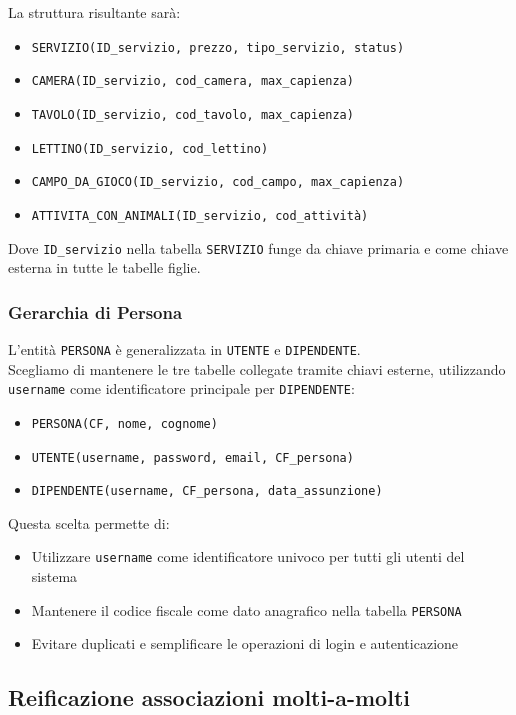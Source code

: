 \documentclass[a4paper,12pt]{report}
\begin{document}
La struttura risultante sarà:
\begin{itemize}
    \item \texttt{SERVIZIO(ID\_servizio, prezzo, tipo\_servizio, status)}
    \item \texttt{CAMERA(ID\_servizio, cod\_camera, max\_capienza)}
    \item \texttt{TAVOLO(ID\_servizio, cod\_tavolo, max\_capienza)}
    \item \texttt{LETTINO(ID\_servizio, cod\_lettino)}
    \item \texttt{CAMPO\_DA\_GIOCO(ID\_servizio, cod\_campo, max\_capienza)}
    \item \texttt{ATTIVITA\_CON\_ANIMALI(ID\_servizio, cod\_attività)}
\end{itemize}

Dove \texttt{ID\_servizio} nella tabella \texttt{SERVIZIO} funge da chiave primaria e come chiave esterna in tutte le tabelle figlie.

\subsubsection*{Gerarchia di Persona}
L'entità \texttt{PERSONA} è generalizzata in \texttt{UTENTE} e \texttt{DIPENDENTE}. \\
Scegliamo di mantenere le tre tabelle collegate tramite chiavi esterne, utilizzando \texttt{username} come identificatore principale per \texttt{DIPENDENTE}:

\begin{itemize}
    \item \texttt{PERSONA(CF, nome, cognome)}
    \item \texttt{UTENTE(username, password, email, CF\_persona)}
    \item \texttt{DIPENDENTE(username, CF\_persona, data\_assunzione)}
\end{itemize}

Questa scelta permette di:
\begin{itemize}
    \item Utilizzare \texttt{username} come identificatore univoco per tutti gli utenti del sistema
    \item Mantenere il codice fiscale come dato anagrafico nella tabella \texttt{PERSONA}
    \item Evitare duplicati e semplificare le operazioni di login e autenticazione
\end{itemize}

\subsection{Reificazione associazioni molti-a-molti}
\end{document}
